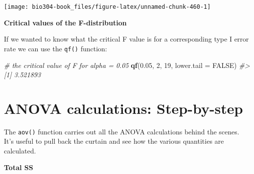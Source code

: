 \documentclass[]{book}
\newenvironment{Shaded}{\begin{snugshade}}{\end{snugshade}}
\newcommand{\CommentTok}[1]{\textcolor[rgb]{0.56,0.35,0.01}{\textit{#1}}}
\newcommand{\DataTypeTok}[1]{\textcolor[rgb]{0.13,0.29,0.53}{#1}}
\newcommand{\DecValTok}[1]{\textcolor[rgb]{0.00,0.00,0.81}{#1}}
\newcommand{\FloatTok}[1]{\textcolor[rgb]{0.00,0.00,0.81}{#1}}
\newcommand{\KeywordTok}[1]{\textcolor[rgb]{0.13,0.29,0.53}{\textbf{#1}}}
\newcommand{\NormalTok}[1]{#1}
\newcommand{\OperatorTok}[1]{\textcolor[rgb]{0.81,0.36,0.00}{\textbf{#1}}}
\newcommand{\OtherTok}[1]{\textcolor[rgb]{0.56,0.35,0.01}{#1}}
\newcommand{\StringTok}[1]{\textcolor[rgb]{0.31,0.60,0.02}{#1}}
\theoremstyle{definition}
\theoremstyle{definition}
\theoremstyle{definition}
\theoremstyle{remark}
\begin{document}
\begin{center}\texttt{[image: bio304-book\_files/figure-latex/unnamed-chunk-460-1]} \end{center}

\textbf{Critical values of the F-distribution}

If we wanted to know what the critical F value is for a corresponding
type I error rate we can use the \texttt{qf()} function:

\begin{Shaded}
\begin{Highlighting}[]
\CommentTok{# the critical value of F for alpha = 0.05}
\KeywordTok{qf}\NormalTok{(}\FloatTok{0.05}\NormalTok{, }\DecValTok{2}\NormalTok{, }\DecValTok{19}\NormalTok{, }\DataTypeTok{lower.tail =} \OtherTok{FALSE}\NormalTok{)}
\CommentTok{#> [1] 3.521893}
\end{Highlighting}
\end{Shaded}

\hypertarget{anova-calculations-step-by-step}{%
\section{ANOVA calculations:
Step-by-step}\label{anova-calculations-step-by-step}}

The \texttt{aov()} function carries out all the ANOVA calculations
behind the scenes. It's useful to pull back the curtain and see how the
various quantities are calculated.

\textbf{Total SS}

\begin{Shaded}
\end{Shaded}
\end{document}
